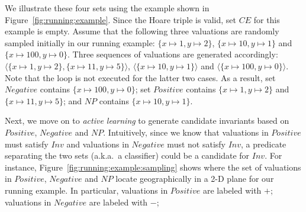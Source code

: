 %
%
\begin{example}
We illustrate these four sets using the example shown in Figure~\ref{fig:running:example}. Since the Hoare triple is valid, set $\mathit{CE}$ for this example is empty. 
Assume that the following three valuations are randomly sampled initially in our running example: $\mathit{\{x \mapsto 1, y \mapsto 2\}}$, $\mathit{\{x \mapsto 10, y \mapsto 1\}}$ and $\mathit{\{x \mapsto 100, y \mapsto 0\}}$. 
Three sequences of valuations are generated accordingly: $\mathit{\langle \{x \mapsto 1, y \mapsto 2\}, \{x \mapsto 11, y \mapsto 5\} \rangle}$, $\mathit{\langle \{x \mapsto 10, y \mapsto 1\} \rangle}$ and $\mathit{\langle \{x \mapsto 100, y \mapsto 0\} \rangle}$. 
Note that the loop is not executed for the latter two cases. 
As a result, set $\mathit{Negative}$ contains $\mathit{\{x \mapsto 100, y \mapsto 0\}}$; 
set $\mathit{Positive}$ contains $\mathit{\{x \mapsto 1, y \mapsto 2\}}$ and $\mathit{\{x \mapsto 11, y \mapsto 5\}}$; 
and $\mathit{NP}$ contains $\mathit{\{x \mapsto 10, y \mapsto 1\}}$.
\end{example}
Next, we move on to \emph{active learning} to generate candidate invariants based on $\mathit{Positive}$, $\mathit{Negative}$ and $\mathit{NP}$. 
Intuitively, since we know that valuations in $\mathit{Positive}$ must satisfy $\mathit{Inv}$ and valuations in $\mathit{Negative}$ must not satisfy $\mathit{Inv}$, 
a predicate separating the two sets (a.k.a.~a classifier) could be a candidate for $\mathit{Inv}$.
For instance, Figure~\ref{fig:running:example:sampling} shows where the set of valuations 
in $\mathit{Positive}$, $\mathit{Negative}$ and $\mathit{NP}$ locate geographically in a 2-D plane for our running example. %
In particular, valuations in $\mathit{Positive}$ are labeled with $+$; %
valuations in $\mathit{Negative}$ are labeled with $-$; %

